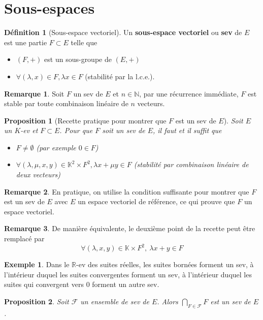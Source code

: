 \documentclass[french]{book}
\newcommand{\K}{\mathbb{K}}
\theoremstyle{plain}
\newtheorem{prop}{Proposition}[chapter]
\theoremstyle{definition}
\newtheorem{dfn}{Définition}[chapter]
\newtheorem{exa}{Exemple}[chapter]
\newtheorem{rmq}{Remarque}[chapter]
\theoremstyle{remark}
\begin{document}
\section{Sous-espaces} %
\begin{dfn}[Sous-espace vectoriel]
	Un \textbf{sous-espace vectoriel} ou \textbf{sev} de $E$ est une partie $F \subset E$ telle que
\begin{itemize}
	\item $(F,+)$ est un sous-groupe de $(E,+)$
	\item $\forall (\lambda, x) \in F, \lambda x \in F$ (stabilité par la l.c.e.).
\end{itemize}
\end{dfn}
\begin{rmq}
	Soit $F$ un sev de $E$ et $n \in \mathbb{N}$, par une récurrence immédiate, $F$ est stable par toute combinaison linéaire de $n$ vecteurs.
\end{rmq}
\begin{prop}[Recette pratique pour montrer que $F$ est un sev de $E$]
	Soit $E$ un $K$-ev et $F \subset E$. Pour que $F$ soit un sev de $E$, il faut et il suffit que
\begin{itemize}
	\item $F \neq \emptyset$ (par exemple $0 \in F$)
	\item $\forall (\lambda, \mu, x, y) \in \mathbb{K}^2 \times F^2, \lambda x + \mu y \in F$ (stabilité par combinaison linéaire de deux vecteurs)
\end{itemize}
\end{prop}
\begin{rmq}
	En pratique, on utilise la condition suffisante pour montrer que $F$ est un sev de $E$ avec $E$ un espace vectoriel de référence, ce qui prouve que $F$ un espace vectoriel.
\end{rmq}
\begin{rmq}
	De manière équivalente, le deuxième point de la recette peut être remplacé par $$\forall(\lambda,x,y)\in\K\times F^2,\ \lambda x+y\in F$$
\end{rmq}
\begin{exa}
	Dans le $\mathbb{R}$-ev des suites réelles, les suites bornées forment un sev, à l'intérieur duquel les suites convergentes forment un sev, à l'intérieur duquel les suites qui convergent vers 0 forment un autre sev.
\end{exa}
\begin{prop}
	Soit $\mathcal{F}$ un ensemble de sev de $E$. Alors $\displaystyle \bigcap_{F \in \mathcal{F}} F$ est un sev de $E$.
\end{prop}
\end{document}
